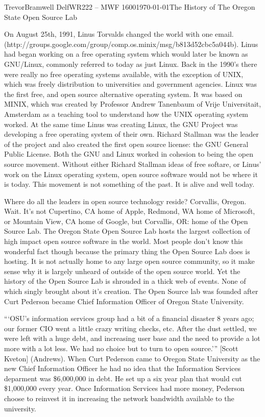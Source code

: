 \documentclass[12pt,letterpaper]{article}
\begin{document}
\begin{mla}{Trevor}{Bramwell}
{Delf}{WR222 -- MWF 1600}{\today}{The History of The Oregon
    State Open Source Lab}

On August 25th, 1991, Linus Torvalds changed the world with one email. 
(http://groups.google.com/group/comp.os.minix/msg/b813d52cbc5a044b). Linus had
began working on a free operating system which would later be known as
GNU/Linux, commonly referred to today as just Linux. Back in the 1990's there
were really no free operating systems available, with the exception of UNIX,
which was freely distribution to universities and government agencies. Linux 
was the first free, and open source alternative operating system. It was based 
on MINIX, which was created by Professor Andrew Tanenbaum of Vrije 
Universitait, Amsterdam as a teaching tool to understand how the UNIX 
operating system worked. At the same time Linus was creating Linux, the GNU
Project was developing a free operating system of their own. Richard Stallman
was the leader of the project and also created the first open source license:
the GNU General Public License. Both the GNU and Linux worked in cohesion to
being the open source movement. Without either Richard Stallman ideas of free
softare, or Linus' work on the Linux operating system, open source software
would not be where it is today.  This movement is not something of the past. 
It is alive and well today.

Where do all the leaders in open source technology reside? Corvallis, Oregon. 
Wait. It's not Cupertino, CA home of Apple, Redmond, WA home of Microsoft,
or Mountain View, CA home of Google, but Corvallis, OR: home of the Open Source
Lab. The Oregon State Open Source Lab hosts the largest collection of high
impact open source software in the world. Most people don't know this wonderful
fact though because the primary thing the Open Source Lab does is hosting. It
is not actually home to any large open source community, so it make sense why
it is largely unheard of outside of the open source world. Yet the history of
the Open Source Lab is shrouded in a thick web of events. None of which singly
brought about it's creation. The Open Source lab was founded after Curt
Pederson became Chief Information Officer of Oregon State University.

```OSU's information services group had a bit of a financial disaster 8 years
ago; our former CIO went a little crazy writing checks, etc. After the dust
settled, we were left with a huge debt, and increasing user base and the need
to provide a lot more with a lot less. We had no choice but to turn to open
source.''' [Scott Kveton] (Andrews).
When Curt Pederson came to Oregon State University as the new Chief Information
Officer he had no idea that the Information Services deparment was \$6,000,000
in debt. He set up a six year plan that would cut \$1,000,000 every year. Once
Information Services had more money, Pederson choose to reinvest it in
increasing the network bandwidth available to the university.


\end{mla}
\end{document}
